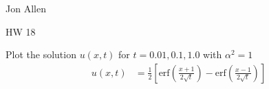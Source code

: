 \documentclass{article}
\begin{document}
Jon Allen

HW 18

Plot the solution $u(x,t)$ for $t=0.01,0.1,1.0$ with $\alpha^2=1$
\begin{align*}
   u(x,t)&=\frac{1}{2}\left[\text{erf}\left(\frac{x+1}{2\sqrt{t}}\right)-\text{erf}\left(\frac{x-1}{2\sqrt{t}}\right)\right]
\end{align*}
\begin{center}
  
\end{center}
\end{document}
